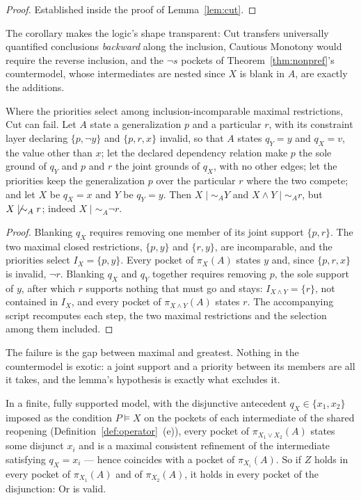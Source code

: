 \begin{proof}
Established inside the proof of Lemma~\ref{lem:cut}.
\end{proof}
\noindent The corollary makes the logic's shape transparent: Cut transfers universally quantified conclusions \emph{backward} along the inclusion, Cautious Monotony would require the reverse inclusion, and the $\neg s$ pockets of Theorem~\ref{thm:nonpref}'s countermodel, whose intermediates are nested since $X$ is blank in $A$, are exactly the additions.
\begin{proposition}\label{prop:cutfail}
Where the priorities select among inclusion-incomparable maximal restrictions, Cut can fail. Let $A$ state a generalization $p$ and a particular $r$, with its constraint layer declaring $\{p, \neg y\}$ and $\{p, r, x\}$ invalid, so that $A$ states $q_Y = y$ and $q_X = v$, the value other than $x$; let the declared dependency relation make $p$ the sole ground of $q_Y$ and $p$ and $r$ the joint grounds of $q_X$, with no other edges; let the priorities keep the generalization $p$ over the particular $r$ where the two compete; and let $X$ be $q_X = x$ and $Y$ be $q_Y = y$. Then $X \mid\sim_A Y$ and $X \wedge Y \mid\sim_A r$, but $X \not\mid\sim_A r$; indeed $X \mid\sim_A \neg r$.
\end{proposition}
\begin{proof}
Blanking $q_X$ requires removing one member of its joint support $\{p, r\}$. The two maximal closed restrictions, $\{p, y\}$ and $\{r, y\}$, are incomparable, and the priorities select $I_X = \{p, y\}$. Every pocket of $\pi_X(A)$ states $y$ and, since $\{p, r, x\}$ is invalid, $\neg r$. Blanking $q_X$ and $q_Y$ together requires removing $p$, the sole support of $y$, after which $r$ supports nothing that must go and stays: $I_{X \wedge Y} = \{r\}$, not contained in $I_X$, and every pocket of $\pi_{X \wedge Y}(A)$ states $r$. The accompanying script recomputes each step, the two maximal restrictions and the selection among them included.
\end{proof}
\noindent The failure is the gap between maximal and greatest. Nothing in the countermodel is exotic: a joint support and a priority between its members are all it takes, and the lemma's hypothesis is exactly what excludes it.
\begin{proposition}\label{prop:or} In a finite, fully supported model, with the disjunctive antecedent $q_X \in \{x_1, x_2\}$ imposed as the condition $P \models X$ on the pockets of each intermediate of the shared reopening (Definition~\ref{def:operator}~(e)), every pocket of $\pi_{X_1 \vee X_2}(A)$ states some disjunct $x_i$ and is a maximal consistent refinement of the intermediate satisfying $q_X = x_i$ --- hence coincides with a pocket of $\pi_{X_i}(A)$. So if $Z$ holds in every pocket of $\pi_{X_1}(A)$ and of $\pi_{X_2}(A)$, it holds in every pocket of the disjunction: Or is valid.
\end{proposition}
